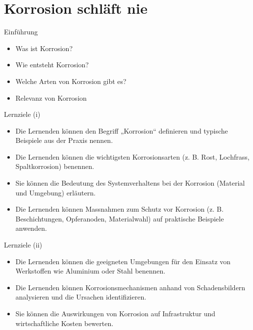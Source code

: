 \section{Korrosion schläft nie}
\BlueSectionSlide


\begin{frame}{Einführung}

    \begin{itemize}
        \item Was ist Korrosion?
        \item Wie entsteht Korrosion?
        \item Welche Arten von Korrosion gibt es?
        \item Relevanz von Korrosion
    \end{itemize}
\end{frame}

\begin{frame}{Lernziele (i)}
    \begin{myLernziele}
        \begin{itemize}
            \item[\textbullet] Die Lernenden können den Begriff „Korrosion“ definieren und typische Beispiele aus der Praxis nennen.
            \item[\textbullet] Die Lernenden können die wichtigsten Korrosionsarten (z. B. Rost, Lochfrass, Spaltkorrosion) benennen.
            \item[\textbullet] Sie können die Bedeutung des Systemverhaltens bei der Korrosion (Material und Umgebung) erläutern.
            \item[\textbullet] Die Lernenden können Massnahmen zum Schutz vor Korrosion (z. B. Beschichtungen, Opferanoden, Materialwahl) auf praktische Beispiele anwenden.

        \end{itemize}
    \end{myLernziele}

\end{frame}
\begin{frame}{Lernziele (ii)}
    \begin{myLernziele}
        \begin{itemize}
            \item[\textbullet] Die Lernenden können die geeigneten Umgebungen für den Einsatz von Werkstoffen wie Aluminium oder Stahl benennen.
            \item[\textbullet] Die Lernenden können Korrosionsmechanismen anhand von Schadensbildern analysieren und die Ursachen identifizieren.
            \item[\textbullet] Sie können die Auswirkungen von Korrosion auf Infrastruktur und wirtschaftliche Kosten bewerten.
        \end{itemize}
    \end{myLernziele}
\end{frame}

